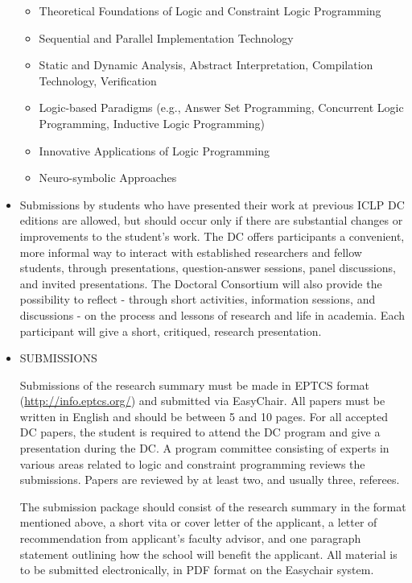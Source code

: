 \documentclass[prodmode,acmtecs]{acmsmall} %
\begin{document}
\begin{itemize}
\begin{itemize}\item  Theoretical Foundations of Logic and Constraint Logic Programming
\item  Sequential and Parallel Implementation Technology
\item  Static and Dynamic Analysis, Abstract Interpretation, Compilation Technology, Verification
\item  Logic-based Paradigms (e.g., Answer Set Programming, Concurrent Logic Programming, Inductive Logic Programming)
\item  Innovative Applications of Logic Programming
\item  Neuro-symbolic Approaches
\end{itemize} 
\item  Submissions by students who have presented their work at previous ICLP DC editions are allowed, but should occur only if there are substantial changes or improvements to the student's work. The DC offers participants a convenient, more informal way to interact with established researchers and fellow students, through presentations, question-answer sessions, panel discussions, and invited presentations. The Doctoral Consortium will also provide the possibility to reflect - through short activities, information sessions, and discussions - on the process and lessons of research and life in academia. Each participant will give a short, critiqued, research presentation. 
 
\item  SUBMISSIONS 
 
  Submissions of the research summary must be made in EPTCS format (\href{http://info.eptcs.org/}{http://info.eptcs.org/}) and submitted via EasyChair. All papers must be written in English and should be between 5 and 10 pages. For all accepted DC papers, the student is required to attend the DC program and give a presentation during the DC. A program committee consisting of experts in various areas related to logic and constraint programming reviews the submissions. Papers are reviewed by at least two, and usually three, referees. 
 
  The submission package should consist of the research summary in the format mentioned above, a short vita or cover letter of the applicant, a letter of recommendation from applicant's faculty advisor, and one paragraph statement outlining how the school will benefit the applicant. All material is to be submitted electronically, in PDF format on the Easychair system. 
 

\end{itemize}
\end{document}
